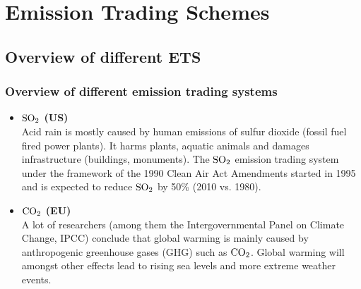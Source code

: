 \section{Emission Trading Schemes}


\subsection[Overview]{Overview of different ETS}
\begin{frame}
  \frametitle{Overview of different emission trading systems}
  \begin{itemize}
  \item<1-> \textbf{$\textnormal{SO}_2$ (US)} \\
        Acid rain is mostly caused by human emissions of sulfur dioxide (fossil fuel fired power plants). It harms plants, aquatic animals and damages infrastructure (buildings, monuments). The $\textnormal{SO}_2$ emission trading system under the framework of the 1990 Clean Air Act Amendments started in 1995 and is expected to reduce $\textnormal{SO}_2$ by 50\% (2010 vs. 1980).
  \item<2-> \textbf{$\textnormal{CO}_2$ (EU)} \\
        A lot of researchers (among them the Intergovernmental Panel on Climate Change, IPCC) conclude that global warming is mainly caused by anthropogenic greenhouse gases (GHG) such as $\textnormal{CO}_2$. Global warming will amongst other effects lead to rising sea levels and  more extreme weather events.
  \end{itemize}
  \end{frame}
	
